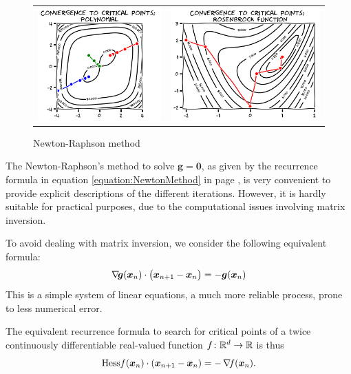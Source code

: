 \begin{figure}[ht!]
\begin{tabular}{cc}
\includegraphics[width=0.45\linewidth]{images/convergenceNewton.png} &
\includegraphics[width=0.55\linewidth]{images/convergenceNewtonRosenbrock.png} 
\end{tabular}
\caption{Newton-Raphson method}
\label{figure:NewtonConvergence}
\end{figure}

\begin{remark}
The Newton-Raphson's method to solve $\boldsymbol{g}=\boldsymbol{0}$, as given by the recurrence formula in equation \eqref{equation:NewtonMethod} in page \pageref{equation:NewtonMethod}, is very convenient to provide explicit descriptions of the different iterations.  However, it is hardly suitable for practical purposes, due to the computational issues involving matrix inversion.

To avoid dealing with matrix inversion, we consider the following equivalent formula:
\begin{equation}
\mathop{\nabla\! {\boldsymbol{g}}}(\boldsymbol{x}_n) \cdot \big( \boldsymbol{x}_{n+1} - \boldsymbol{x}_n \big) = -\boldsymbol{g}(\boldsymbol{x}_n)
\end{equation}
This is a simple system of linear equations, a much more reliable process, prone to less numerical error.

The equivalent recurrence formula to search for critical points of a twice continuously differentiable real-valued function $f \colon \mathbb{R}^d \to \mathbb{R}$ is thus
\begin{equation}
\mathop{\mathrm{Hess}{f}}(\boldsymbol{x}_n) \cdot (\boldsymbol{x}_{n+1}-\boldsymbol{x}_n) = -\mathop{\nabla\! {f}}(\boldsymbol{x}_n).
\end{equation}
\end{remark}

